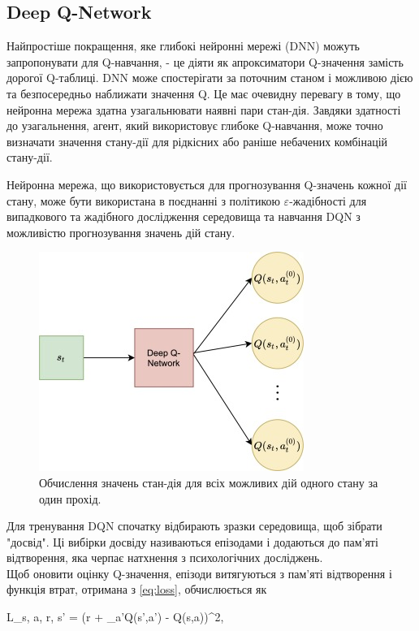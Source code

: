\subsection{Deep Q-Network}
Найпростіше покращення, яке глибокі нейронні мережі (DNN) можуть запропонувати
 для Q-навчання, - це діяти як апроксиматори Q-значення замість дорогої 
 Q-таблиці. DNN може спостерігати за поточним станом і можливою дією та 
 безпосередньо наближати значення Q. Це має очевидну перевагу в тому, що 
 нейронна мережа здатна узагальнювати наявні пари стан-дія. Завдяки здатності
  до узагальнення, агент, який використовує глибоке Q-навчання, може точно 
  визначати значення стану-дії для рідкісних або раніше небачених комбінацій 
  стану-дії.
  \par Нейронна мережа, що використовується для прогнозування Q-значень кожної дії стану, може бути використана в 
  поєднанні з політикою $\varepsilon$-жадібності для випадкового та жадібного дослідження
  середовища та навчання DQN з можливістю прогнозування значень дій стану.
  \begin{figure}[H]
    \centering
    \includegraphics[scale = 1]{Pictures/DQN.jpg}
    \caption{Обчислення значень стан-дія для всіх можливих дій одного стану за один прохід.}
    \label{fig:DQN}
  \end{figure}

  Для тренування DQN спочатку відбирають зразки середовища, щоб зібрати "досвід". Ці 
  вибірки досвіду називаються епізодами і додаються до пам'яті відтворення, яка черпає
   натхнення з психологічних досліджень.\\ Щоб оновити оцінку Q-значення, епізоди 
   витягуються з пам'яті відтворення і функція втрат, отримана з \ref{eq:loss}, обчислюється як

    L_{s, a, r, s'} = (r + \gamma \max_{a'}Q(s',a') - Q(s,a))^2, \eq


